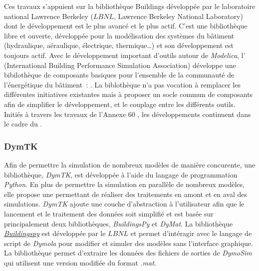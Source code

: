 Ces travaux s’appuient sur la bibliothèque Buildings \parencite{Wetter2014253} développée
par le laboratoire national Lawrence Berkeley ($LBNL$, Lawrence Berkeley National
Laboratory) dont le développement est le plus avancé et le plus actif. C’est une
bibliothèque libre et ouverte, développée pour la modélisation des systèmes du bâtiment
(hydraulique, aéraulique, électrique, thermique\dots) et son développement est toujours
actif.
Avec le développement important d’outils autour de \textit{Modelica}, l’
(International Building Performance Simulation Association) développe une bibilothèque de
composants basiques pour l’ensemble de la communauté de l’énergétique du bâtiment~:
. La biblothèque
n’a pas vocation à remplacer les différentes initiatives existantes mais à proposer un
socle commun de composants afin de simplifier le développement, et le couplage entre les
différents outils. Initiés à travers les travaux de l’Annexe $60$ \parencite{Wetter2015},
les développements continuent dans le cadre du .


\subsubsection{DymTK} %
\label{ssub:dymtk}
Afin de permettre la simulation de nombreux modèles de manière concurente, une
bibliothèque, \textit{DymTK}, est développée à l’aide du langage de programmation
\textit{Python}. En plus de permettre la simulation en parallèle de nombreux modèles, elle
propose une  permettant de réaliser des traitements en amont et en aval des
simulations. \textit{DymTK} ajoute une couche d’abstraction à l’utilisateur afin que le
lancement et le traitement des données soit simplifié et est basée sur principalement deux
bibliothèques, \textit{BuildingsPy} et \textit{DyMat}. La bibliothèque
\href{http://simulationresearch.lbl.gov/modelica/buildingspy/}{\textit{Buildingspy}} est
développée par le $LBNL$ et permet d’intéragir avec le langage de script de
\textit{Dymola} pour modifier et simuler des modèles sans l’interface graphique. La
bibliothèque 
permet d’extraire les données des fichiers de sorties de
\textit{DymoSim} qui utilisent une version modifiée du format \textit{.mat}.


